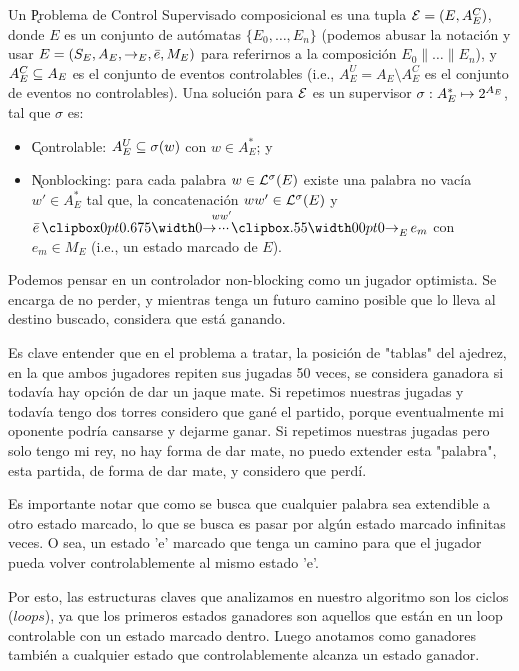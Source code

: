 \begin{definition} \label{def:control-problem}
	Un \k{Problema de Control Supervisado} composicional es una tupla $\mathcal{E} = (E, A_E^C)$, donde $E$ es un conjunto de autómatas $\{E_0,\ldots,E_n\}$ (podemos abusar la notación y usar $E = (S_E,A_E,\rightarrow_E,\bar{e},M_E)$ para referirnos a la composición $E_0\|\ldots\|E_n$), y $A_E^C \subseteq A_E$ es el conjunto de eventos controlables (i.e., $A_E^U = A_E \setminus A_E^C$ es el conjunto de eventos no controlables).
	Una solución para $\mathcal{E}$ es un supervisor $\sigma : A_E^* \mapsto 2^{A_E}$, tal que $\sigma$ es:
	\begin{itemize}[itemsep=4pt,topsep=-8pt]
		
		\item \k{Controlable}: $A_E^U \subseteq \sigma(w)$ con $w \in A_E^*$; y
		
		\item \k{Nonblocking}: para cada palabra $w \in \mathcal{L}^\sigma(E)$ existe una palabra no vacía $w' \in A_E^*$ tal que, la concatenación $ww' \in \mathcal{L}^\sigma(E)$ y $\init{e} \runw{\;ww'}{E} e_m$ con $e_m \in M_E$ (i.e., un estado marcado de $E$).
		
	\end{itemize}
	
\end{definition}

Podemos pensar en un controlador non-blocking como un jugador optimista. Se encarga de no perder, y mientras tenga un futuro camino posible que lo lleva al destino buscado, considera que está ganando.

Es clave entender que en el problema a tratar, la posición de "tablas" del ajedrez, en la que ambos jugadores repiten sus jugadas 50 veces, se considera ganadora si todavía hay opción de dar un jaque mate. Si repetimos nuestras jugadas y todavía tengo dos torres considero que gané el partido, porque eventualmente mi oponente podría cansarse y dejarme ganar. Si repetimos nuestras jugadas pero solo tengo mi rey, no hay forma de dar mate, no puedo extender esta "palabra", esta partida, de forma de dar mate, y considero que perdí.

Es importante notar que como se busca que cualquier palabra sea extendible a otro estado marcado, lo que se busca es pasar por algún estado marcado infinitas veces. O sea, un estado 'e' marcado que tenga un camino para que el jugador pueda volver controlablemente al mismo estado 'e'.

Por esto, las estructuras claves que analizamos en nuestro algoritmo son los ciclos ($loops$), ya que los primeros estados ganadores son aquellos que están en un loop controlable con un estado marcado dentro. Luego anotamos como ganadores también a cualquier estado que controlablemente alcanza un estado ganador.

